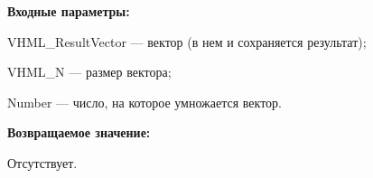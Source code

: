 \textbf{Входные параметры:}

 VHML\_ResultVector --- вектор (в нем и сохраняется результат);
 
 VHML\_N --- размер вектора;
 
 Number --- число, на которое умножается вектор.

\textbf{Возвращаемое значение:}

Отсутствует.